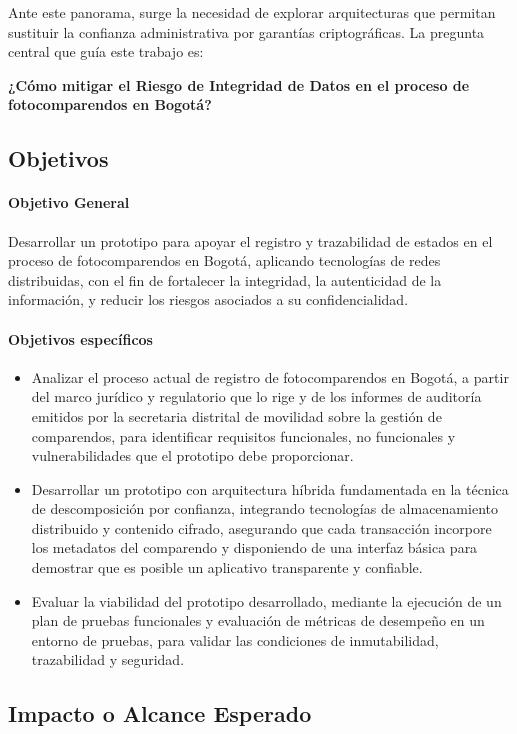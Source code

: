 Ante este panorama, surge la necesidad de explorar arquitecturas que permitan sustituir la confianza administrativa por garantías criptográficas. La pregunta central que guía este trabajo es:

\textbf{¿Cómo mitigar el Riesgo de Integridad de Datos en el proceso de fotocomparendos en Bogotá?} 

\subsection{Objetivos}
\paragraph{Objetivo General}
Desarrollar un prototipo para apoyar el registro y trazabilidad de estados en el proceso de fotocomparendos en Bogotá, aplicando tecnologías de redes distribuidas, con el fin de fortalecer la integridad, la autenticidad de la información, y reducir los riesgos asociados a su confidencialidad.

\paragraph{Objetivos específicos}
\begin{itemize}
    \item Analizar el proceso actual de registro de fotocomparendos en Bogotá, a partir del marco jurídico y regulatorio que lo rige y de los informes de auditoría emitidos por la secretaria distrital de movilidad sobre la gestión de comparendos, para identificar requisitos funcionales, no funcionales y vulnerabilidades que el prototipo debe proporcionar.
    \item Desarrollar un prototipo con arquitectura híbrida fundamentada en la técnica de descomposición por confianza, integrando tecnologías de almacenamiento distribuido y contenido cifrado, asegurando que cada transacción incorpore los metadatos del comparendo y disponiendo de una interfaz básica para demostrar que es posible un aplicativo transparente y confiable.
    \item Evaluar la viabilidad del prototipo desarrollado, mediante la ejecución de un plan de pruebas funcionales y evaluación de métricas de desempeño en un entorno de pruebas, para validar las condiciones de inmutabilidad, trazabilidad y seguridad.
\end{itemize}

\subsection{Impacto o Alcance Esperado}
